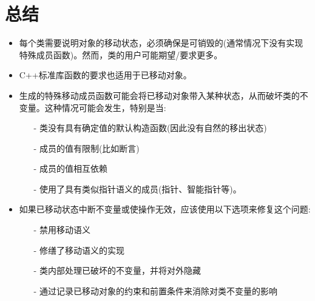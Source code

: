 \section{总结}
\begin{itemize}
	\item 每个类需要说明对象的移动状态，必须确保是可销毁的(通常情况下没有实现特殊成员函数)。然而，类的用户可能期望/要求更多。
	\item C++标准库函数的要求也适用于已移动对象。
	\item 生成的特殊移动成员函数可能会将已移动对象带入某种状态，从而破坏类的不变量。这种情况可能会发生，特别是当:
	\begin{itemize}
		\item[-] 类没有具有确定值的默认构造函数(因此没有自然的移出状态)
		\item[-] 成员的值有限制(比如断言)
		\item[-] 成员的值相互依赖
		\item[-] 使用了具有类似指针语义的成员(指针、智能指针等)。
	\end{itemize}
	\item 如果已移动状态中断不变量或使操作无效，应该使用以下选项来修复这个问题:
	\begin{itemize}
		\item[-] 禁用移动语义
		\item[-] 修缮了移动语义的实现
		\item[-] 类内部处理已破坏的不变量，并将对外隐藏
		\item[-] 通过记录已移动对象的约束和前置条件来消除对类不变量的影响
	\end{itemize}
\end{itemize}


